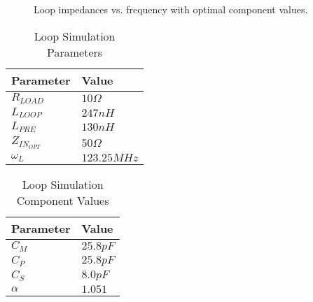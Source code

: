 \newpage
\begin{figure}
    \centering
    
    \caption{Loop impedances vs. frequency with optimal component values.}
    \label{fig:impedance_plot}
\end{figure}

\begin{table}[]
\centering
\caption{Loop Simulation Parameters}
\label{tab:sim_independent}
\begin{tabular}{|l|l|}
\hline
Parameter  & Value       \\
\hline
$R_{LOAD}$ & $10\Omega$  \\
$L_{LOOP}$ & $247nH$     \\
$L_{PRE}$  & $130nH$     \\
    $Z_{IN_{OPT}}$  & $50\Omega$     \\
$\omega_L$ & $123.25MHz$ \\
\hline
\end{tabular}
\end{table}

\begin{table}[]
\centering
\caption{Loop Simulation Component Values}
\label{tab:sim_dependent}
\begin{tabular}{|l|l|}
\hline
Parameter & Value       \\
\hline
$C_M$     & $25.8pF$  \\
$C_P$     & $25.8pF$     \\
$C_S$     & $8.0pF$     \\
$\alpha$  & $1.051$ \\
\hline
\end{tabular}
\end{table}
